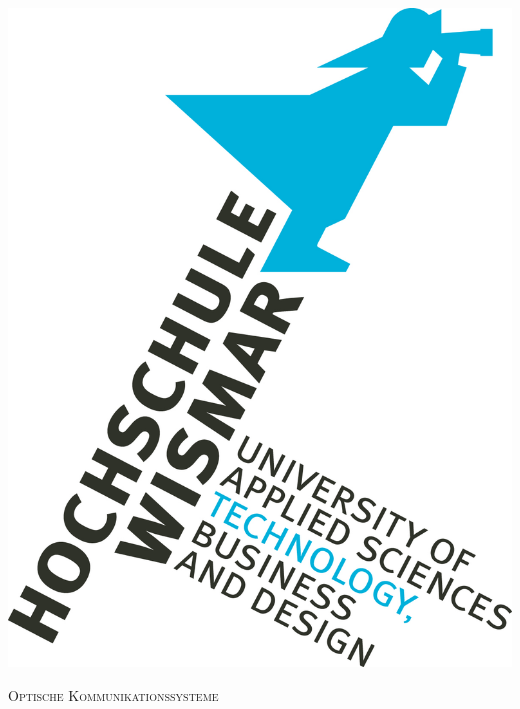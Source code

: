 \documentclass[12pt]{article}
\begin{document}
\begin{titlepage}

\newcommand{\HRule}{\rule{\linewidth}{0.5mm}} %

\center %


\noindent\begin{minipage}[t][0.3819660112501052\paperheight][t]{\textwidth}
\centering
\vspace{0.1458980337503154\paperheight}
\includegraphics[scale=0.382]{logo.jpg}
\end{minipage}

\textsc{\Large Optische Kommunikationssysteme}\\[0.5cm] %


\end{titlepage}
\end{document}
